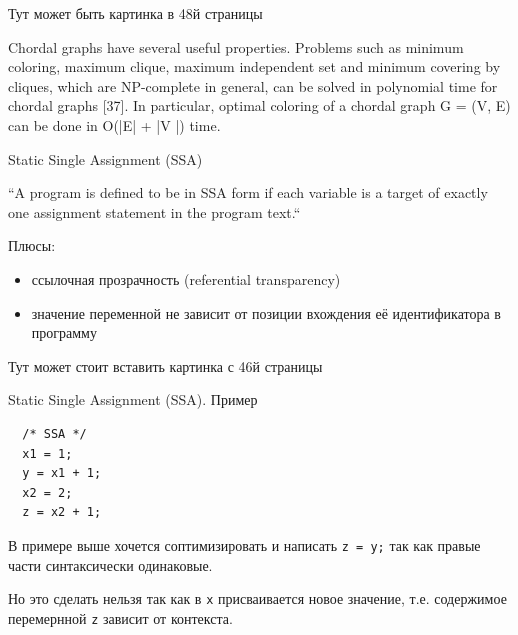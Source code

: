 \documentclass[aspectratio=169
  , xcolor={svgnames}
  , hyperref={ colorlinks,citecolor=DeepPink4
             , linkcolor=DarkRed,urlcolor=DarkBlue}
  , russian
  ]{beamer}
\theoremstyle{exerciseStyle1}
\begin{document}
\begin{frame}[fragile]{}
Тут может быть картинка в 48й страницы

Chordal graphs have several useful properties. Problems such as minimum
coloring, maximum clique, maximum independent set and minimum covering by
cliques, which are NP-complete in general, can be solved in polynomial time for
chordal graphs [37]. In particular, optimal coloring of a chordal graph G = (V, E)
can be done in O(|E| + |V |) time.

\end{frame}


\begin{frame}[fragile]{Static Single Assignment (SSA)}

\begin{definition}
``A program is defined to be in SSA form if each variable is a target of exactly one assignment statement in the program text.``
\end{definition}

Плюсы:
\begin{itemize}
\item ссылочная прозрачность (referential transparency)
\item значение переменной не зависит от позиции вхождения её идентификатора в программу
\end{itemize}
\end{frame}


\begin{frame}[fragile]{}
Тут может стоит вставить картинка с 46й страницы
\end{frame}


\begin{frame}[fragile]{Static Single Assignment (SSA). Пример}
\hfill
\begin{minipage}[t]{0.48\linewidth}
  \begin{verbatim}
  /* SSA */
  x1 = 1;
  y = x1 + 1;
  x2 = 2;
  z = x2 + 1;
  \end{verbatim}
\end{minipage}\vspace{1em}

В примере выше хочется соптимизировать и написать \texttt{z = y;} так как правые части синтаксически одинаковые.

Но это сделать нельзя так как в \texttt{x} присваивается новое значение, т.е. содержимое перемернной \texttt{z} зависит от контекста.
\end{frame}
\end{document}

